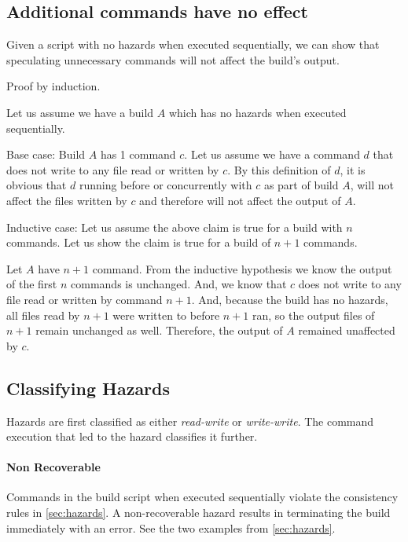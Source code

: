 \subsection{Additional commands have no effect}
\label{sec:proof:additional}

Given a script with no hazards when executed sequentially, we can show that speculating unnecessary commands will not affect the build's output. %

Proof by induction.

Let us assume we have a build $A$ which has no hazards when executed sequentially.

Base case:  Build $A$ has 1 command $c$.  Let us assume we have a command $d$ that does not write to any file read or written by $c$.  By this definition of $d$, it is obvious that $d$ running before or
concurrently with $c$ as part of build $A$, will not affect the files written by $c$ and therefore will not affect the output of $A$.

Inductive case: Let us assume the above claim is true for a build with $n$ commands.  Let us show the claim is true for a build of $n+1$ commands.

Let $A$ have $n+1$ command.  From the inductive hypothesis we know the output of the first $n$ commands is unchanged.  And, we know that $c$ does not write to any file read or written by command $n+1$.  And, because the build has no hazards, all files read by $n+1$ were written to before $n+1$ ran, so the output files of $n+1$ remain unchanged as well.  Therefore, the output of $A$ remained unaffected by $c$.

\subsection{Classifying Hazards}
\label{sec:proof:classify_hazard}

Hazards are first classified as either \emph{read-write} or \emph{write-write}.  The command execution that led to the hazard classifies it further.

\paragraph{Non Recoverable}
Commands in the build script when executed sequentially violate the consistency rules in \ref{sec:hazards}.  A non-recoverable hazard results in \Rattle terminating the build immediately with an error.  See the two examples from \ref{sec:hazards}.


